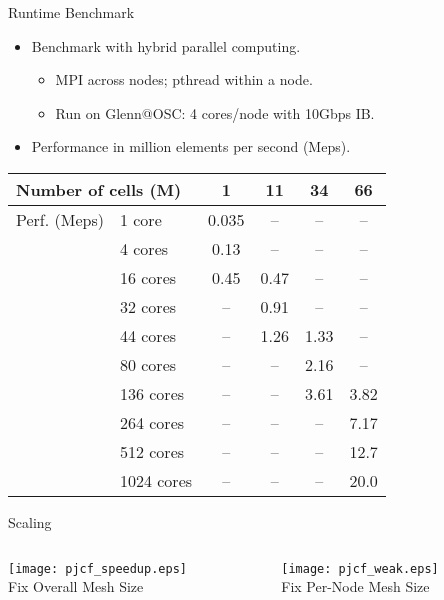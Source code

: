 \documentclass[dvips,xcolor=pst,14pt]{beamer}
\begin{document}
\begin{frame}{
%
Runtime Benchmark
%
}
\begin{itemize}
  \item Benchmark with hybrid parallel computing.
  \begin{itemize}
    \item MPI across nodes; pthread within a node.
    \item Run on Glenn@OSC: 4 cores/node with 10Gbps IB.
  \end{itemize}
  \item Performance in million elements per second (Meps).
\end{itemize}
\begin{center} \footnotesize
  \begin{tabular}{ll|cccc}
  \multicolumn{2}{l|}{Number of cells (M)}
                            & 1     & 11   & 34   & 66   \\
  \hline
  Perf. (Meps) &    1 core  & 0.035 & --   & --   & --   \\
               &    4 cores & 0.13  & --   & --   & --   \\
               &   16 cores & 0.45  & 0.47 & --   & --   \\
               &   32 cores & --    & 0.91 & --   & --   \\
               &   44 cores & --    & 1.26 & 1.33 & --   \\
               &   80 cores & --    & --   & 2.16 & --   \\
               &  136 cores & --    & --   & 3.61 & 3.82 \\
               &  264 cores & --    & --   & --   & 7.17 \\
               &  512 cores & --    & --   & --   & 12.7 \\
               & 1024 cores & --    & --   & --   & 20.0
  \end{tabular}
\end{center}
\end{frame}

\begin{frame}{
%
Scaling
%
}
\begin{columns}[c]
\begin{column}{.5\textwidth}
\begin{center}
  \texttt{[image: pjcf\_speedup.eps]} \\
  Fix Overall Mesh Size
\end{center}
\end{column}
\begin{column}{.5\textwidth}
\begin{center}
  \texttt{[image: pjcf\_weak.eps]} \\
  Fix Per-Node Mesh Size
\end{center}
\end{column}
\end{columns}
\end{frame}
\end{document}
